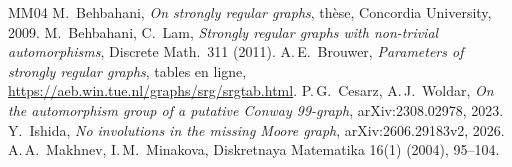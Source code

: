 \documentclass[11pt,a4paper]{article}
\theoremstyle{remark}
\begin{document}
{\small
\begin{thebibliography}{MM04}
 M.~Behbahani, \emph{On strongly regular graphs}, thèse, Concordia University, 2009.
 M.~Behbahani, C.~Lam, \emph{Strongly regular graphs with non-trivial automorphisms}, Discrete Math.\ 311 (2011).
 A.\,E.~Brouwer, \emph{Parameters of strongly regular graphs}, tables en ligne,
\url{https://aeb.win.tue.nl/graphs/srg/srgtab.html}.
 P.\,G.~Cesarz, A.\,J.~Woldar, \emph{On the automorphism group of a putative Conway 99-graph},
arXiv:2308.02978, 2023.
 Y.~Ishida, \emph{No involutions in the missing Moore graph}, arXiv:2606.29183v2, 2026.
 A.\,A.~Makhnev, I.\,M.~Minakova, Diskretnaya Matematika 16(1) (2004), 95--104.
\end{thebibliography}
}
\end{document}
